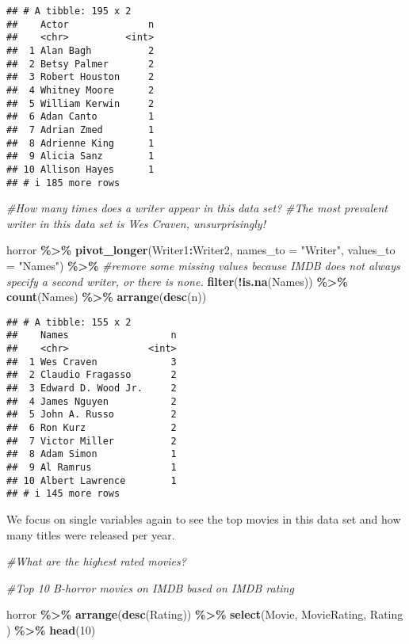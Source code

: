 \documentclass[
]{article}
\newenvironment{Shaded}{\begin{snugshade}}{\end{snugshade}}
\newcommand{\AttributeTok}[1]{\textcolor[rgb]{0.13,0.29,0.53}{#1}}
\newcommand{\CommentTok}[1]{\textcolor[rgb]{0.56,0.35,0.01}{\textit{#1}}}
\newcommand{\DecValTok}[1]{\textcolor[rgb]{0.00,0.00,0.81}{#1}}
\newcommand{\FunctionTok}[1]{\textcolor[rgb]{0.13,0.29,0.53}{\textbf{#1}}}
\newcommand{\NormalTok}[1]{#1}
\newcommand{\SpecialCharTok}[1]{\textcolor[rgb]{0.81,0.36,0.00}{\textbf{#1}}}
\newcommand{\StringTok}[1]{\textcolor[rgb]{0.31,0.60,0.02}{#1}}
\begin{document}
\begin{verbatim}
## # A tibble: 195 x 2
##    Actor              n
##    <chr>          <int>
##  1 Alan Bagh          2
##  2 Betsy Palmer       2
##  3 Robert Houston     2
##  4 Whitney Moore      2
##  5 William Kerwin     2
##  6 Adan Canto         1
##  7 Adrian Zmed        1
##  8 Adrienne King      1
##  9 Alicia Sanz        1
## 10 Allison Hayes      1
## # i 185 more rows
\end{verbatim}

\begin{Shaded}
\begin{Highlighting}[]
\CommentTok{\#How many times does a writer appear in this data set? }
\CommentTok{\#The most prevalent writer in this data set is Wes Craven, unsurprisingly!}

\NormalTok{horror }\SpecialCharTok{\%\textgreater{}\%} 
  \FunctionTok{pivot\_longer}\NormalTok{(Writer1}\SpecialCharTok{:}\NormalTok{Writer2, }\AttributeTok{names\_to =} \StringTok{"Writer"}\NormalTok{, }\AttributeTok{values\_to =} \StringTok{"Names"}\NormalTok{) }\SpecialCharTok{\%\textgreater{}\%} 
  \CommentTok{\#remove some missing values because IMDB does not always specify a second writer, or there is none. }
  \FunctionTok{filter}\NormalTok{(}\SpecialCharTok{!}\FunctionTok{is.na}\NormalTok{(Names)) }\SpecialCharTok{\%\textgreater{}\%} 
  \FunctionTok{count}\NormalTok{(Names) }\SpecialCharTok{\%\textgreater{}\%} 
  \FunctionTok{arrange}\NormalTok{(}\FunctionTok{desc}\NormalTok{(n))}
\end{Highlighting}
\end{Shaded}

\begin{verbatim}
## # A tibble: 155 x 2
##    Names                  n
##    <chr>              <int>
##  1 Wes Craven             3
##  2 Claudio Fragasso       2
##  3 Edward D. Wood Jr.     2
##  4 James Nguyen           2
##  5 John A. Russo          2
##  6 Ron Kurz               2
##  7 Victor Miller          2
##  8 Adam Simon             1
##  9 Al Ramrus              1
## 10 Albert Lawrence        1
## # i 145 more rows
\end{verbatim}

We focus on single variables again to see the top movies in this data
set and how many titles were released per year.

\begin{Shaded}
\begin{Highlighting}[]
\CommentTok{\#What are the highest rated movies? }

\CommentTok{\#Top 10 B{-}horror movies on IMDB based on IMDB rating}

\NormalTok{horror }\SpecialCharTok{\%\textgreater{}\%}
  \FunctionTok{arrange}\NormalTok{(}\FunctionTok{desc}\NormalTok{(Rating)) }\SpecialCharTok{\%\textgreater{}\%} 
  \FunctionTok{select}\NormalTok{(Movie, MovieRating, Rating ) }\SpecialCharTok{\%\textgreater{}\%}
  \FunctionTok{head}\NormalTok{(}\DecValTok{10}\NormalTok{)}
\end{Highlighting}
\end{Shaded}
\end{document}
